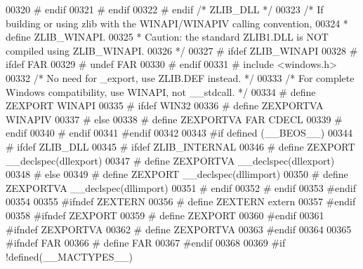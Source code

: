 \begin{DoxyCode}
00320 \textcolor{preprocessor}{#      endif}
00321 \textcolor{preprocessor}{#    endif}
00322 \textcolor{preprocessor}{#  endif  }\textcolor{comment}{/* ZLIB\_DLL */}\textcolor{preprocessor}{}
00323    \textcolor{comment}{/* If building or using zlib with the WINAPI/WINAPIV calling convention,}
00324 \textcolor{comment}{    * define ZLIB\_WINAPI.}
00325 \textcolor{comment}{    * Caution: the standard ZLIB1.DLL is NOT compiled using ZLIB\_WINAPI.}
00326 \textcolor{comment}{    */}
00327 \textcolor{preprocessor}{#  ifdef ZLIB\_WINAPI}
00328 \textcolor{preprocessor}{#    ifdef FAR}
00329 \textcolor{preprocessor}{#      undef FAR}
00330 \textcolor{preprocessor}{#    endif}
00331 \textcolor{preprocessor}{#    include <windows.h>}
00332      \textcolor{comment}{/* No need for \_export, use ZLIB.DEF instead. */}
00333      \textcolor{comment}{/* For complete Windows compatibility, use WINAPI, not \_\_stdcall. */}
00334 \textcolor{preprocessor}{#    define ZEXPORT WINAPI}
00335 \textcolor{preprocessor}{#    ifdef WIN32}
00336 \textcolor{preprocessor}{#      define ZEXPORTVA WINAPIV}
00337 \textcolor{preprocessor}{#    else}
00338 \textcolor{preprocessor}{#      define ZEXPORTVA FAR CDECL}
00339 \textcolor{preprocessor}{#    endif}
00340 \textcolor{preprocessor}{#  endif}
00341 \textcolor{preprocessor}{#endif}
00342 
00343 \textcolor{preprocessor}{#if defined (\_\_BEOS\_\_)}
00344 \textcolor{preprocessor}{#  ifdef ZLIB\_DLL}
00345 \textcolor{preprocessor}{#    ifdef ZLIB\_INTERNAL}
00346 \textcolor{preprocessor}{#      define ZEXPORT   \_\_declspec(dllexport)}
00347 \textcolor{preprocessor}{#      define ZEXPORTVA \_\_declspec(dllexport)}
00348 \textcolor{preprocessor}{#    else}
00349 \textcolor{preprocessor}{#      define ZEXPORT   \_\_declspec(dllimport)}
00350 \textcolor{preprocessor}{#      define ZEXPORTVA \_\_declspec(dllimport)}
00351 \textcolor{preprocessor}{#    endif}
00352 \textcolor{preprocessor}{#  endif}
00353 \textcolor{preprocessor}{#endif}
00354 
00355 \textcolor{preprocessor}{#ifndef ZEXTERN}
00356 \textcolor{preprocessor}{#  define ZEXTERN extern}
00357 \textcolor{preprocessor}{#endif}
00358 \textcolor{preprocessor}{#ifndef ZEXPORT}
00359 \textcolor{preprocessor}{#  define ZEXPORT}
00360 \textcolor{preprocessor}{#endif}
00361 \textcolor{preprocessor}{#ifndef ZEXPORTVA}
00362 \textcolor{preprocessor}{#  define ZEXPORTVA}
00363 \textcolor{preprocessor}{#endif}
00364 
00365 \textcolor{preprocessor}{#ifndef FAR}
00366 \textcolor{preprocessor}{#  define FAR}
00367 \textcolor{preprocessor}{#endif}
00368 
00369 \textcolor{preprocessor}{#if !defined(\_\_MACTYPES\_\_)}

\end{DoxyCode}
